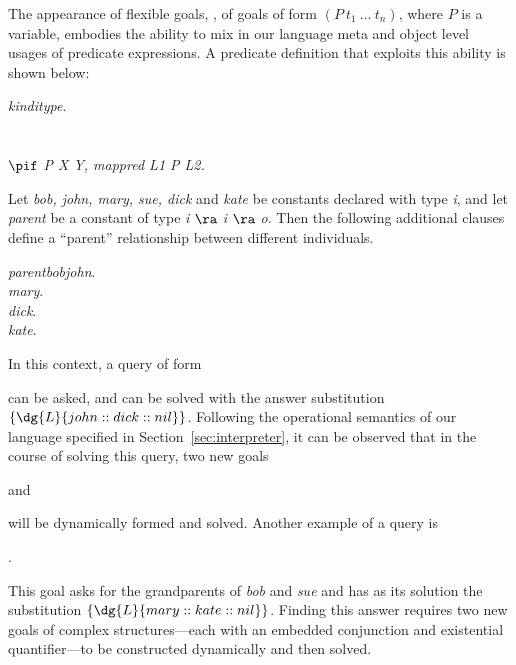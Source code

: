 The appearance of flexible goals, \ie, of goals of form
$(P\ t_1\ \ldots\ t_n)$, where
$P$ is a variable, embodies the ability to mix in our language
meta and object level usages of predicate expressions.
A predicate definition that exploits this ability is shown below:
\begin{tabbing}
\dquad\dquad\={\it kind}\dquad\dquad\={\it i}\dquad\dquad\={\it type}.\\
             \\[5pt]
             \\
             $\pif$ {\it P X Y, mappred L1 P L2.}
\end{tabbing}
Let {\it bob, john, mary, sue, dick} and {\it kate} be constants declared
with type {\it i}, and let {\it parent} be a constant of type
{\it i $\ra$ i $\ra$ o}. Then the following additional clauses
define a ``parent'' relationship between different individuals.
\begin{tabbing}
\dquad\dquad\={\it parent}\dquad\dquad\={\it bob}\dquad\={\it john}.\\
            \> {\it mary}.\\
            \> {\it dick}.\\
            \> {\it kate}.
\end{tabbing}
In this context, a query of form
\begin{tabbing}
\dquad{}
\end{tabbing}
can be asked, and can be solved with the answer
substitution $\{\dg{L}{john::dick::nil}\}$.
Following the operational semantics of our language specified in
Section~\ref{sec:interpreter}, it can be observed that in the course of
solving this query, two new goals
\begin{tabbing}
\dquad{}\dquad and
\end{tabbing}
will be dynamically formed and solved. Another example of a query is
\begin{tabbing}
.
\end{tabbing}
This goal asks for the grandparents of {\it bob} and {\it sue} and has as
its solution the substitution $\{\dg{L}{mary::kate::nil}\}$. Finding this
answer requires two new goals of complex structures---each with an
embedded conjunction and existential quantifier---to be constructed
dynamically and then solved.

